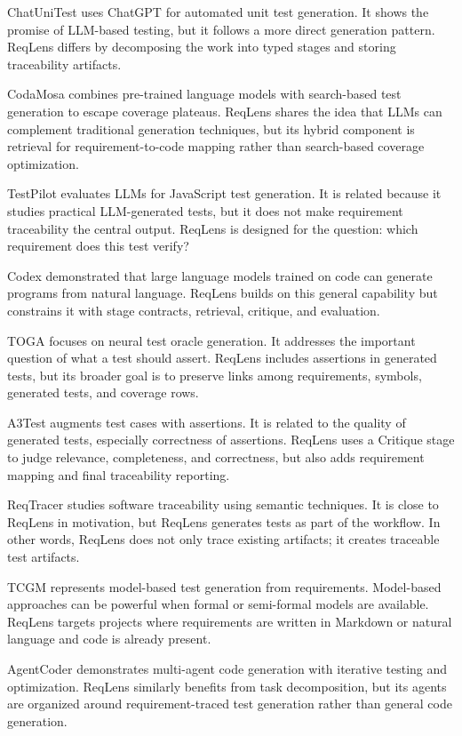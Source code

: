 \documentclass[conference]{IEEEtran}
\begin{document}
ChatUniTest \cite{chatunitest} uses ChatGPT for automated unit test generation.
It shows the promise of LLM-based testing, but it follows a more direct
generation pattern. ReqLens differs by decomposing the work into typed stages
and storing traceability artifacts.

CodaMosa \cite{codamosa} combines pre-trained language models with
search-based test generation to escape coverage plateaus. ReqLens shares the
idea that LLMs can complement traditional generation techniques, but its hybrid
component is retrieval for requirement-to-code mapping rather than search-based
coverage optimization.

TestPilot \cite{testpilot} evaluates LLMs for JavaScript test generation. It
is related because it studies practical LLM-generated tests, but it does not
make requirement traceability the central output. ReqLens is designed for the
question: which requirement does this test verify?

Codex \cite{codex} demonstrated that large language models trained on code can
generate programs from natural language. ReqLens builds on this general
capability but constrains it with stage contracts, retrieval, critique, and
evaluation.

TOGA \cite{toga} focuses on neural test oracle generation. It addresses the
important question of what a test should assert. ReqLens includes assertions in
generated tests, but its broader goal is to preserve links among requirements,
symbols, generated tests, and coverage rows.

A3Test \cite{a3test} augments test cases with assertions. It is related to the
quality of generated tests, especially correctness of assertions. ReqLens uses
a Critique stage to judge relevance, completeness, and correctness, but also
adds requirement mapping and final traceability reporting.

ReqTracer \cite{reqtracer} studies software traceability using semantic
techniques. It is close to ReqLens in motivation, but ReqLens generates tests
as part of the workflow. In other words, ReqLens does not only trace existing
artifacts; it creates traceable test artifacts.

TCGM \cite{tcgm} represents model-based test generation from requirements.
Model-based approaches can be powerful when formal or semi-formal models are
available. ReqLens targets projects where requirements are written in Markdown
or natural language and code is already present.

AgentCoder \cite{agentcoder} demonstrates multi-agent code generation with
iterative testing and optimization. ReqLens similarly benefits from task
decomposition, but its agents are organized around requirement-traced test
generation rather than general code generation.
\end{document}

